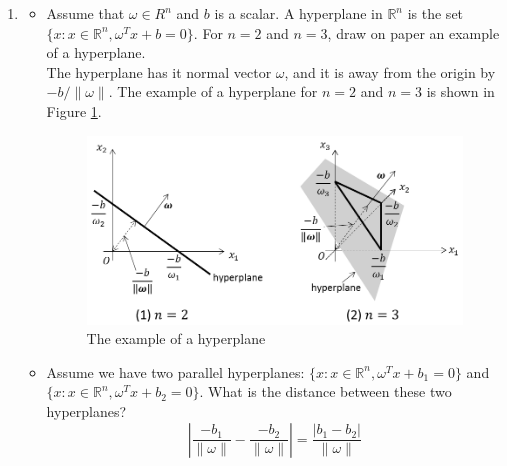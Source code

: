 \begin{enumerate}
\item 
\begin{itemize}
\item Assume that $\omega \in R^n$ and $b$ is a scalar. A hyperplane in $\mathbb{R}^n$ is the set $\{x : x\in \mathbb{R}^n, \omega^Tx+b=0\}$. For $n=2$ and $n=3$, draw on paper an example of a hyperplane.\\
The hyperplane has it normal vector $\omega$, and it is away from the origin by $-b/\|\omega\|$. The example of a hyperplane for $n=2$ and $n=3$ is shown in Figure \ref{fig:one}.

\begin{figure}[hbtp]
\centering
\includegraphics[width=130mm]{figure1.png}
\caption{The example of a hyperplane}
\label{fig:one}
\end{figure}


\item Assume we have two parallel hyperplanes: $\{x: x\in \mathbb{R}^n, \omega^Tx+b_1=0\}$ and $\{x: x\in \mathbb{R}^n, \omega^Tx+b_2=0\}$. What is the distance between these two hyperplanes?
\[
\left|\frac{-b_1}{\|\omega\|}-\frac{-b_2}{\|\omega\|}\right|=\frac{|b_1-b_2|}{\|\omega\|}
\]
\end{itemize}
\end{enumerate}

